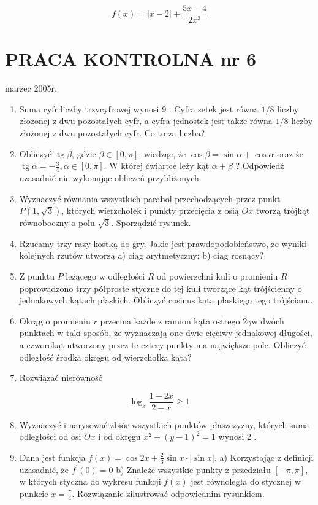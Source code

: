 \documentclass[10pt]{article}
\begin{document}
$$
f(x)=|x-2|+\frac{5 x-4}{2 x^{3}}
$$

\section*{PRACA KONTROLNA nr 6}
marzec 2005r.

\begin{enumerate}
  \item Suma cyfr liczby trzycyfrowej wynosi 9 . Cyfra setek jest równa $1 / 8$ liczby złożonej z dwu pozostałych cyfr, a cyfra jednostek jest także równa $1 / 8$ liczby złożonej z dwu pozostałych cyfr. Co to za liczba?
  \item Obliczyć $\operatorname{tg} \beta$, gdzie $\beta \in[0, \pi]$, wiedząc, że $\cos \beta=\sin \alpha+\cos \alpha$ oraz że $\operatorname{tg} \alpha=-\frac{3}{4}, \alpha \in[0, \pi]$. W której ćwiartce leży kąt $\alpha+\beta$ ? Odpowiedź uzasadnić nie wykonując obliczeń przybliżonych.
  \item Wyznaczyć równania wszystkich parabol przechodzących przez punkt $P(1, \sqrt{3})$, których wierzchołek i punkty przecięcia z osią $O x$ tworzą trójkąt równoboczny o polu $\sqrt{3}$. Sporządzić rysunek.
  \item Rzucamy trzy razy kostką do gry. Jakie jest prawdopodobieństwo, że wyniki kolejnych rzutów utworzą a) ciąg arytmetyczny; b) ciąg rosnący?
  \item Z punktu $P$ leżącego w odległości $R$ od powierzchni kuli o promieniu $R$ poprowadzono trzy półproste styczne do tej kuli tworzące kąt trójścienny o jednakowych kątach płaskich. Obliczyć cosinus kąta płaskiego tego trójścianu.
  \item Okrąg o promieniu $r$ przecina każde z ramion kąta ostrego $2 \gamma \mathrm{w}$ dwóch punktach w taki sposób, że wyznaczają one dwie cięciwy jednakowej długości, a czworokąt utworzony przez te cztery punkty ma największe pole. Obliczyć odległość środka okręgu od wierzchołka kąta?
  \item Rozwiązać nierówność
\end{enumerate}

$$
\log _{x} \frac{1-2 x}{2-x} \geqslant 1
$$

\begin{enumerate}
  \setcounter{enumi}{7}
  \item Wyznaczyć i narysować zbiór wszystkich punktów płaszczyzny, których suma odległości od osi $O x$ i od okręgu $x^{2}+(y-1)^{2}=1$ wynosi 2 .
  \item Dana jest funkcja $f(x)=\cos 2 x+\frac{2}{3} \sin x \cdot|\sin x|$. a) Korzystając z definicji uzasadnić, że $f^{\prime}(0)=0$ b) Znaleźć wszystkie punkty z przedziału $[-\pi, \pi]$, w których styczna do wykresu funkcji $f(x)$ jest równoległa do stycznej w punkcie $x=\frac{\pi}{4}$. Rozwiązanie zilustrować odpowiednim rysunkiem.
\end{enumerate}
\end{document}
